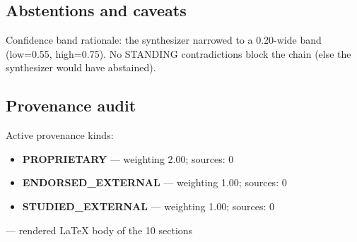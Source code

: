 \subsection*{Abstentions and caveats}
Confidence band rationale: the synthesizer narrowed to a 0.20-wide band (low=0.55, high=0.75). No STANDING contradictions block the chain (else the synthesizer would have abstained).

\subsection*{Provenance audit}
Active provenance kinds:
\begin{itemize}
\item \textbf{PROPRIETARY} — weighting 2.00; sources: 0
\item \textbf{ENDORSED\_EXTERNAL} — weighting 1.00; sources: 0
\item \textbf{STUDIED\_EXTERNAL} — weighting 1.00; sources: 0
\end{itemize}       — rendered LaTeX body of the 10 sections
%
\documentclass[11pt]{article}

\usepackage[margin=1in]{geometry}
\usepackage{microtype}
\usepackage{titlesec}
\usepackage{enumitem}
\usepackage[hidelinks]{hyperref}
\usepackage{graphicx}
\usepackage[T1]{fontenc}
\usepackage{textcomp}


\titleformat{\section}{\large\bfseries}{}{0pt}{}
\titlespacing{\section}{0pt}{14pt}{4pt}
\titleformat{\subsection}{\normalsize\bfseries}{}{0pt}{}
\titlespacing{\subsection}{0pt}{10pt}{2pt}

